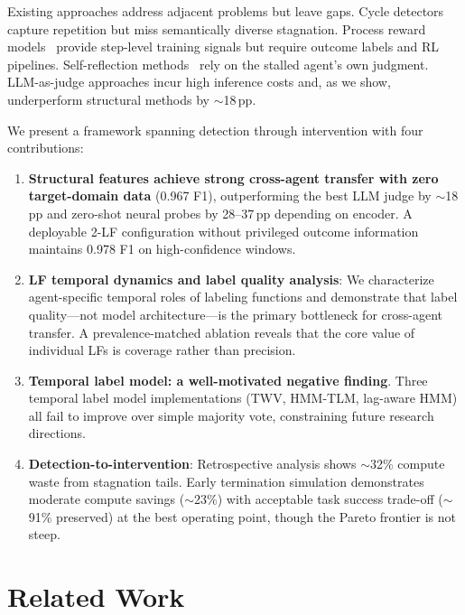 \documentclass[11pt,a4paper]{article}
\begin{document}
Existing approaches address adjacent problems but leave gaps.
Cycle detectors~\cite{cdcs2024,specra2025} capture repetition but miss semantically diverse stagnation.
Process reward models~\cite{agentprm2026,prm_framework2025} provide step-level training signals but require outcome labels and RL pipelines.
Self-reflection methods~\cite{reflexion2023,lats2024} rely on the stalled agent's own judgment.
LLM-as-judge approaches incur high inference costs and, as we show, underperform structural methods by ${\sim}$18\,pp.

We present a framework spanning detection through intervention with four contributions:

\begin{enumerate}[leftmargin=*,itemsep=2pt]
\item \textbf{Structural features achieve strong cross-agent transfer with zero target-domain data} (0.967 F1), outperforming the best LLM judge by ${\sim}$18\,pp and zero-shot neural probes by 28--37\,pp depending on encoder. A deployable 2-LF configuration without privileged outcome information maintains 0.978 F1 on high-confidence windows.

\item \textbf{LF temporal dynamics and label quality analysis}: We characterize agent-specific temporal roles of labeling functions and demonstrate that label quality---not model architecture---is the primary bottleneck for cross-agent transfer. A prevalence-matched ablation reveals that the core value of individual LFs is coverage rather than precision.

\item \textbf{Temporal label model: a well-motivated negative finding}. Three temporal label model implementations (TWV, HMM-TLM, lag-aware HMM) all fail to improve over simple majority vote, constraining future research directions.

\item \textbf{Detection-to-intervention}: Retrospective analysis shows ${\sim}$32\% compute waste from stagnation tails. Early termination simulation demonstrates moderate compute savings (${\sim}$23\%) with acceptable task success trade-off (${\sim}$91\% preserved) at the best operating point, though the Pareto frontier is not steep.
\end{enumerate}

\section{Related Work}
\end{document}

